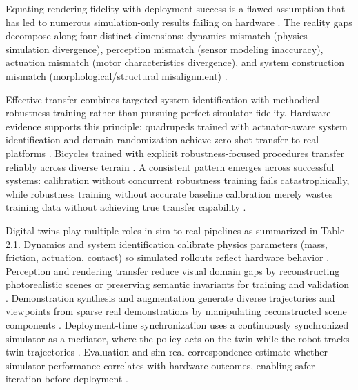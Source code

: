 \documentclass[12pt,a4paper,oneside]{report}
\begin{document}
Equating rendering fidelity with deployment success is a flawed assumption that has led to numerous simulation-only results failing on hardware \cite{aljalbout2026realitygap}. The reality gaps decompose along four distinct dimensions: dynamics mismatch (physics simulation divergence), perception mismatch (sensor modeling inaccuracy), actuation mismatch (motor characteristics divergence), and system construction mismatch (morphological/structural misalignment) \cite{aljalbout2026realitygap, tan2018simtoreal}.

Effective transfer combines targeted system identification with methodical robustness training rather than pursuing perfect simulator fidelity. Hardware evidence supports this principle: quadrupeds trained with actuator-aware system identification and domain randomization achieve zero-shot transfer to real platforms \cite{tan2018simtoreal}. Bicycles trained with explicit robustness-focused procedures transfer reliably across diverse terrain \cite{liu2024cyclerl}. A consistent pattern emerges across successful systems: calibration without concurrent robustness training fails catastrophically, while robustness training without accurate baseline calibration merely wastes training data without achieving true transfer capability \cite{tan2018simtoreal, aljalbout2026realitygap}.

Digital twins play multiple roles in sim-to-real pipelines as summarized in Table 2.1. Dynamics and system identification calibrate physics parameters (mass, friction, actuation, contact) so simulated rollouts reflect hardware behavior \cite{tan2018simtoreal, heiden2022inferring, lou2026drex}. Perception and rendering transfer reduce visual domain gaps by reconstructing photorealistic scenes or preserving semantic invariants for training and validation \cite{qureshi2025splatsim, tang2025semantic}. Demonstration synthesis and augmentation generate diverse trajectories and viewpoints from sparse real demonstrations by manipulating reconstructed scene components \cite{yang2025robosplat, yu2025real2render2real}. Deployment-time synchronization uses a continuously synchronized simulator as a mediator, where the policy acts on the twin while the robot tracks twin trajectories \cite{abou2024realissim}. Evaluation and sim-real correspondence estimate whether simulator performance correlates with hardware outcomes, enabling safer iteration before deployment \cite{jain2025polaris, li2024simpler}.
\end{document}
